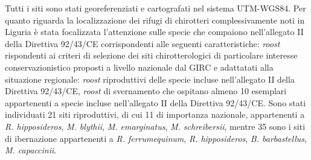 {Tutti i siti sono stati georeferenziati e cartografati nel sistema UTM-WGS84. Per quanto riguarda la localizzazione dei rifugi di chirotteri complessivamente noti in Liguria è stata focalizzata l’attenzione sulle specie che compaiono nell'allegato II della Direttiva 92/43/CE corrispondenti alle seguenti caratteristiche: \textit{roost} rispondenti ai criteri di selezione dei siti chirotterologici di particolare interesse conservazionistico proposti a livello nazionale dal GIRC e adattatati alla situazione regionale: \textit{roost} riproduttivi delle specie incluse nell'allegato II della Direttiva 92/43/CE, \textit{roost} di svernamento che ospitano almeno 10 esemplari appartenenti a specie incluse nell'allegato II della Direttiva 92/43/CE. Sono stati individuati 21 siti riproduttivi, di cui 11 di importanza nazionale, appartenenti a \emph{R. hipposideros}, \emph{M. blythii}, \emph{M. emarginatus}, \emph{M. schreibersii}, mentre 35 sono i siti di ibernazione appartenenti a \emph{R. ferrumequinum}, \emph{R. hipposideros}, \emph{B. barbastellus}, \emph{M. capaccinii}.
} %